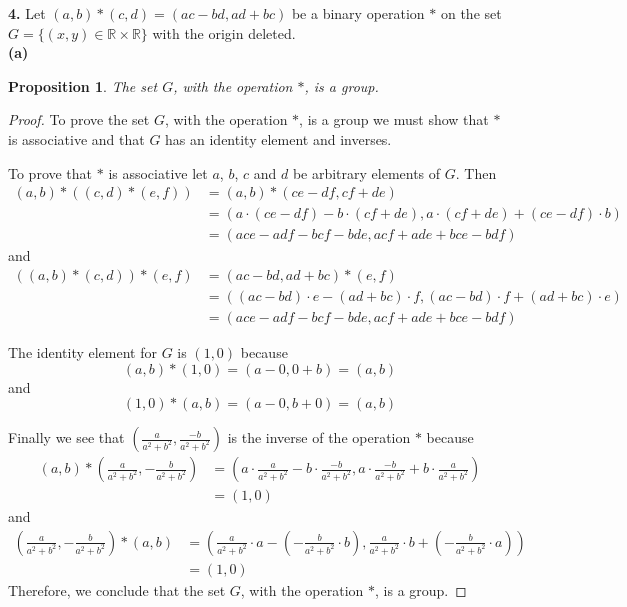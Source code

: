 \documentclass[12pt]{article}   %
\newtheorem*{proposition}{Proposition}  %
\begin{document}
\noindent\textbf{4.} \quad Let $(a,b)*(c,d) = (ac - bd, ad + bc)$ be a binary operation $*$ on the set $G = \{(x,y) \in \mathbb{R} \times \mathbb{R}\}$ with the origin deleted. \\

\noindent\textbf{(a)}
\begin{proposition}
The set $G$, with the operation $\ast$, is a group.
\end{proposition}
\begin{proof}
To prove the set $G$, with the operation $\ast$, is a group we must show that $\ast$ is associative and that $G$ has an identity element and inverses.

To prove that $*$ is associative let $a$, $b$, $c$ and $d$ be arbitrary elements of $G$. Then
\begin{align*}
(a,b) * ((c,d) * (e,f)) &= (a,b) * (ce - df, cf + de) \\
&= (a \cdot (ce - df) - b \cdot (cf + de), a \cdot (cf + de) + (ce - df) \cdot b) \\
&= (ace - adf - bcf - bde, acf + ade + bce - bdf)
\end{align*}
and
\begin{align*}
((a,b) * (c,d)) * (e,f) &= (ac - bd, ad + bc) * (e,f) \\
&= ((ac - bd) \cdot e - (ad + bc) \cdot f, (ac - bd) \cdot f + (ad + bc) \cdot e) \\
&= (ace - adf - bcf - bde, acf + ade + bce - bdf)
\end{align*}

The identity element for $G$ is $(1,0)$ because
\begin{equation*}
(a,b) * (1,0) = (a - 0, 0 + b) = (a,b)
\end{equation*}
and
\begin{equation*}
(1,0) * (a,b) = (a - 0, b + 0) = (a,b)
\end{equation*}

Finally we see that $(\tfrac{a}{a^2 + b^2}, \tfrac{-b}{a^2 + b^2})$ is the inverse of the operation $\ast$ because
\begin{align*}
(a,b) * \left( \frac{a}{a^2 + b^2}, -\frac{b}{a^2 + b^2} \right) &= \left( a \cdot \frac{a}{a^2 + b^2} - b \cdot \frac{-b}{a^2 + b^2}, a \cdot \frac{-b}{a^2 + b^2} + b \cdot \frac{a}{a^2 + b^2} \right) \\
&= (1,0)
\end{align*}
and
\begin{align*}
 \left( \frac{a}{a^2 + b^2}, -\frac{b}{a^2 + b^2} \right) * (a,b) &= \left(\frac{a}{a^2 + b^2} \cdot a - \left(-\frac{b}{a^2 + b^2} \cdot b \right), \frac{a}{a^2 + b^2} \cdot b + \left( -\frac{b}{a^2 + b^2} \cdot a \right) \right) \\
&= (1,0)
\end{align*}
Therefore, we conclude that the set $G$, with the operation $\ast$, is a group.
\end{proof}
\end{document}
